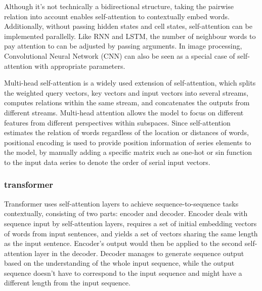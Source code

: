 Although it's not technically a bidirectional structure, taking the pairwise relation into account enables self-attention to contextually embed words.
Additionally, without passing hidden states and cell states, self-attention can be implemented parallelly.
Like RNN and LSTM, the number of neighbour words to pay attention to can be adjusted by passing arguments.
In image processing, Convolutional Neural Network (CNN) can also be seen as a special case of self-attention with appropriate parameters\cite{cordonnier2019relationship}.

Multi-head self-attention is a widely used extension of self-attention, which splits the weighted query vectors, key vectors and input vectors into several streams, computes relations within the same stream, and concatenates the outputs from different streams.
Multi-head attention allows the model to focus on different features from different perspectives within subspaces.
Since self-attention estimates the relation of words regardless of the location or distances of words, positional encoding is used to provide position information of series elements to the model, by manually adding a specific matrix such as one-hot or sin function to the input data series to denote the order of serial input vectors.

\subsubsection{transformer}
Transformer uses self-attention layers to achieve sequence-to-sequence tasks contextually, consisting of two parts: encoder and decoder.
Encoder deals with sequence input by self-attention layers, requires a set of initial embedding vectors of words from input sentences, and yields a set of vectors sharing the same length as the input sentence.
Encoder's output would then be applied to the second self-attention layer in the decoder. 
Decoder manages to generate sequence output based on the understanding of the whole input sequence, while the output sequence doesn't have to correspond to the input sequence and might have a different length from the input sequence.

